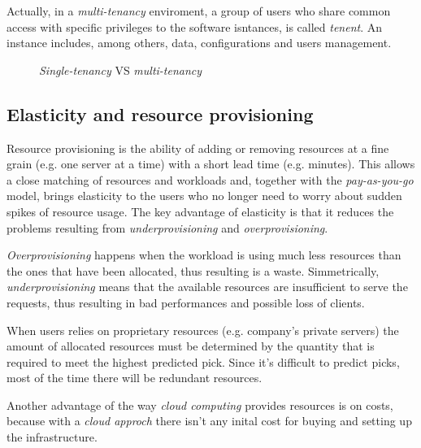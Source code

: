 Actually, in a \emph{multi-tenancy} enviroment, a group of users who share
common access with specific privileges to the software isntances, is called
\emph{tenent}. An instance includes, among others, data, configurations and
users management.

\newpage
\begin{figure}[ht!]
    \centering
    \hspace{2mm}
    \hspace{2mm}
    \caption{\emph{Single-tenancy} VS \emph{multi-tenancy}}
\end{figure}

\subsection{Elasticity and resource provisioning}
Resource provisioning is the ability of adding or removing resources at a fine
grain (e.g. one server at a time) with a short lead time (e.g. minutes). This
allows a close matching of resources and workloads and, together with the
\emph{pay-as-you-go} model, brings elasticity to the users who no longer need
to worry about sudden spikes of resource usage. The key advantage of elasticity
is that it reduces the problems resulting from \emph{underprovisioning} and
\emph{overprovisioning}.

\emph{Overprovisioning} happens when the workload is using much less resources
than the ones that have been allocated, thus resulting is a waste.
Simmetrically, \emph{underprovisioning} means that the available resources are
insufficient to serve the requests, thus resulting in bad performances and
possible loss of clients.

When users relies on proprietary resources (e.g. company's private servers) the
amount of allocated resources must be determined by the quantity that is
required to meet the highest predicted pick. Since it's difficult to predict
picks, most of the time there will be redundant resources.

Another advantage of the way \emph{cloud computing} provides resources is on costs,
because with a \emph{cloud approch} there isn't any inital cost for buying and
setting up the infrastructure.

